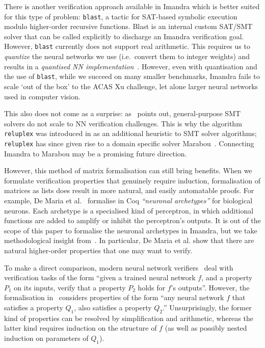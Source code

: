\documentclass[runningheads]{llncs}
\begin{document}
There is another verification approach available in Imandra which is better suited for this type of problem:  \lstinline{blast}, a tactic for SAT-based symbolic execution modulo
higher-order recursive functions. Blast is an internal custom SAT/SMT solver that can be called explicitly to discharge an Imandra verification goal.
 However, \lstinline{blast} currently does not support real arithmetic. This
 requires us to \emph{quantize} the neural networks we use (i.e.\ convert them to
 integer weights) and results in a \emph{quantised NN implementation}~\cite{DPKD22}.
 However, even with quantisation and the use of  \lstinline{blast}, while we succeed on many smaller benchmarks, Imandra fails to scale `out of the box' to the ACAS Xu challenge, let alone larger neural networks used in computer vision.

 This also does not come as a surprise: as~\cite{KaBaDiJuKo17Reluplex} points out, general-purpose SMT solvers do not scale to NN verification challenges.
This is why the algorithm \lstinline{reluplex} was introduced in \cite{KaBaDiJuKo17Reluplex} as an additional heuristic to SMT solver algorithms;
\lstinline{reluplex} has since given rise to a domain specific solver Marabou~\cite{KatzHIJLLSTWZDK19}.
Connecting Imandra to Marabou may be a promising future direction. 

However, this method of matrix formalisation can still bring benefits. When
we formulate verification properties that genuinely require induction,
formalisation of matrices as lists does result in more natural, and easily
automatable proofs. For example, De Maria et al.~\cite{MariaBLFGRG22} formalise
in Coq \emph{``neuronal archetypes''} for biological neurons. Each archetype is
a specialised kind of perceptron, in which additional functions are added to
amplify or inhibit the perceptron's outputs. It is out of the scope of this paper to
formalise the neuronal archetypes in Imandra, but we take methodological insight
from~\cite{MariaBLFGRG22}. In particular, De Maria et al. show that there
are natural higher-order properties that one may want to verify.

To make a direct comparison, modern neural network
verifiers~\cite{KaBaDiJuKo17Reluplex,SinghGPV19} deal with verification tasks of
the form ``given a trained neural network $f$, and a property $P_1$ on its
inputs, verify that a property $P_2$ holds for $f$'s outputs''. However, the
formalisation in~\cite{MariaBLFGRG22} considers properties of the form ``any
neural network $f$ that satisfies a property $Q_1$, also satisfies a property
$Q_2$.'' Unsurprisingly, the former kind of properties can be resolved by
simplification and arithmetic, whereas the latter kind requires
induction on the structure of $f$ (as well as possibly nested induction on
parameters of $Q_1$).
\end{document}
